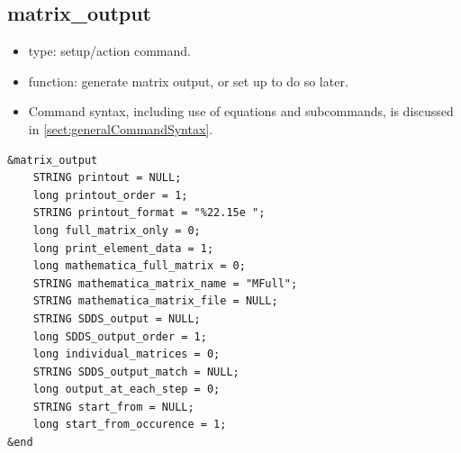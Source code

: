 \documentclass[11pt]{article}
\begin{document}
\subsection{matrix\_output \label{subsec:matrixoutput}}

\begin{itemize}
\item type: setup/action command.
\item function: generate matrix output, or set up to do so later.
\item Command syntax, including use of equations and subcommands, is discussed in \ref{sect:generalCommandSyntax}.
\end{itemize}

\begin{verbatim}
&matrix_output
    STRING printout = NULL;
    long printout_order = 1;
    STRING printout_format = "%22.15e ";
    long full_matrix_only = 0;
    long print_element_data = 1;
    long mathematica_full_matrix = 0;
    STRING mathematica_matrix_name = "MFull";
    STRING mathematica_matrix_file = NULL;
    STRING SDDS_output = NULL;
    long SDDS_output_order = 1;
    long individual_matrices = 0;
    STRING SDDS_output_match = NULL;
    long output_at_each_step = 0;
    STRING start_from = NULL;
    long start_from_occurence = 1;
&end
\end{verbatim}
\end{document}

